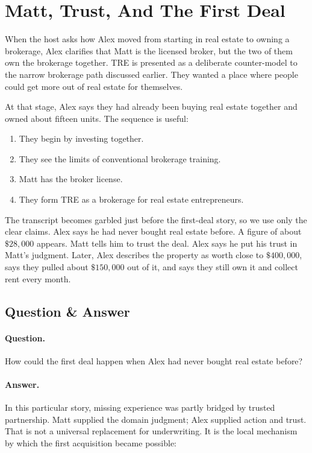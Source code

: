 \section{Matt, Trust, And The First Deal}

When the host asks how Alex moved from starting in real estate to owning a brokerage, Alex clarifies that Matt is the licensed broker, but the two of them own the brokerage together. TRE is presented as a deliberate counter-model to the narrow brokerage path discussed earlier. They wanted a place where people could get more out of real estate for themselves.

At that stage, Alex says they had already been buying real estate together and owned about fifteen units. The sequence is useful:

\begin{enumerate}
\item They begin by investing together.
\item They see the limits of conventional brokerage training.
\item Matt has the broker license.
\item They form TRE as a brokerage for real estate entrepreneurs.
\end{enumerate}

The transcript becomes garbled just before the first-deal story, so we use only the clear claims. Alex says he had never bought real estate before. A figure of about \(\$28{,}000\) appears. Matt tells him to trust the deal. Alex says he put his trust in Matt's judgment. Later, Alex describes the property as worth close to \(\$400{,}000\), says they pulled about \(\$150{,}000\) out of it, and says they still own it and collect rent every month.

\subsection{Question \& Answer}

\paragraph{Question.}
How could the first deal happen when Alex had never bought real estate before?

\paragraph{Answer.}
In this particular story, missing experience was partly bridged by trusted partnership. Matt supplied the domain judgment; Alex supplied action and trust. That is not a universal replacement for underwriting. It is the local mechanism by which the first acquisition became possible:

